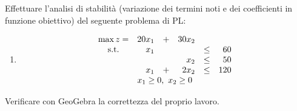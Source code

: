 \documentclass{beamer}
\begin{document}
\generatitolo

\begin{frame}{\esercizi}
Effettuare l'analisi di stabilit\`a (variazione dei termini
noti e dei coefficienti in funzione obiettivo) del seguente 
problema di PL:

\begin{enumerate}
\item
\[\begin{array}{crrrcr}
\max z=& 20 x_1 &+& 30 x_2\\
{\rm s.t.} & x_1 & &       & \leq &  60 \\
           &     & &   x_2 & \leq &  50  \\
           & x_1 &+& 2 x_2 & \leq & 120  \\
           \multicolumn{6}{c}{x_1 \geq 0,\ x_2 \geq 0}
\end{array}%
\]%
\end{enumerate}

Verificare con GeoGebra la correttezza del proprio lavoro.
\end{frame}
\end{document}
